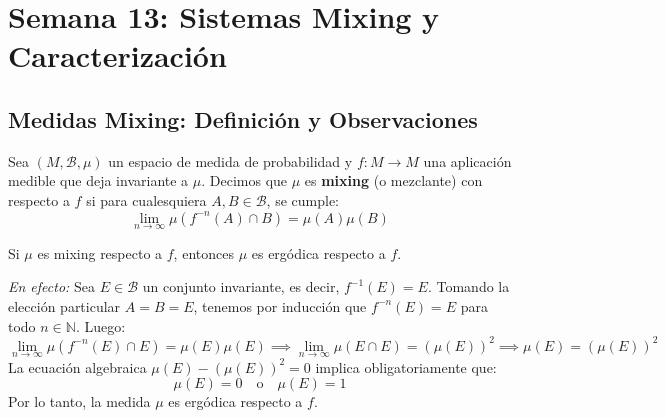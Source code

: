 
\chapter{Semana 13: Sistemas Mixing y Caracterización}

\section{Medidas Mixing: Definición y Observaciones}

\begin{definicion}
	Sea $(M, \mathcal{B}, \mu)$ un espacio de medida de probabilidad y $f: M \to M$ una aplicación medible que deja invariante a $\mu$. Decimos que $\mu$ es \textbf{mixing} (o mezclante) con respecto a $f$ si para cualesquiera $A, B \in \mathcal{B}$, se cumple:
	$$ \lim_{n \to \infty} \mu(f^{-n}(A) \cap B) = \mu(A)\mu(B) $$
\end{definicion}

\begin{observacion}
	Si $\mu$ es mixing respecto a $f$, entonces $\mu$ es ergódica respecto a $f$.
	
	\textit{En efecto:} Sea $E \in \mathcal{B}$ un conjunto invariante, es decir, $f^{-1}(E) = E$. Tomando la elección particular $A = B = E$, tenemos por inducción que $f^{-n}(E) = E$ para todo $n \in \mathbb{N}$. Luego:
	$$ \lim_{n \to \infty} \mu(f^{-n}(E) \cap E) = \mu(E)\mu(E) \implies \lim_{n \to \infty} \mu(E \cap E) = (\mu(E))^2 \implies \mu(E) = (\mu(E))^2 $$
	La ecuación algebraica $\mu(E) - (\mu(E))^2 = 0$ implica obligatoriamente que:
	$$ \mu(E) = 0 \quad \text{o} \quad \mu(E) = 1 $$
	Por lo tanto, la medida $\mu$ es ergódica respecto a $f$.
\end{observacion}

